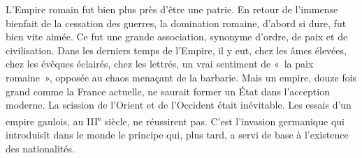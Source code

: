 \documentclass[french,twoside]{book} %
\newcommand\orgName[1]{#1}
\newcommand\placeName[1]{#1}
\begin{document}
L’{\orgName Empire romain} fut bien plus près d’être une patrie. En retour de l’immense bienfait de la cessation des guerres, la domination romaine, d’abord si dure, fut bien vite aimée. Ce fut une grande association, synonyme d’ordre, de paix et de civilisation. Dans les derniers temps de l’{\orgName Empire}, il y eut, chez les âmes élevées, chez les évêques éclairés, chez les lettrés, un vrai sentiment de « la paix romaine », opposée au chaos menaçant de la barbarie. Mais un empire, douze fois grand comme la {\placeName France} actuelle, ne saurait former un État dans l’acception moderne. La scission de l’{\placeName Orient} et de l’{\placeName Occident} était inévitable. Les essais d’un {\orgName empire gaulois}, au III\textsuperscript{e} siècle, ne réussirent pas. C’est l’invasion germanique qui introduisît dans le monde le principe qui, plus tard, a servi de base à l’existence des nationalités.\par
\end{document}
